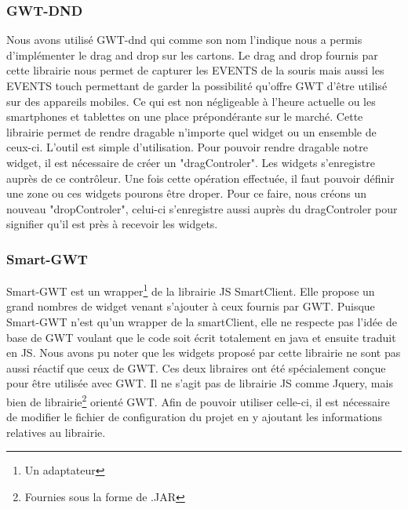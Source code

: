 \subsubsection{GWT-DND}
Nous avons utilisé GWT-dnd qui comme son nom l'indique nous a permis
d'implémenter le drag and drop sur les cartons. Le drag and drop fournis par
cette librairie nous permet de capturer les EVENTS de la souris mais aussi les EVENTS touch permettant de garder la possibilité qu'offre GWT d'être utilisé sur des appareils mobiles. Ce qui est non négligeable à l'heure actuelle ou les smartphones et tablettes on une place prépondérante sur le marché. Cette librairie permet de rendre dragable n'importe quel widget ou un ensemble de ceux-ci.
\newline
\indent
L'outil est simple d'utilisation. Pour pouvoir rendre dragable notre widget, il est nécessaire de créer un "dragControler". Les widgets s'enregistre auprès de ce contrôleur. Une fois cette opération effectuée, il faut pouvoir définir une zone ou ces widgets pourons être droper. Pour ce faire, nous créons un nouveau "dropControler", celui-ci s'enregistre aussi auprès du dragControler pour signifier qu'il est près à recevoir les widgets.

\subsubsection{Smart-GWT}
Smart-GWT est un wrapper\footnote{Un adaptateur} de la librairie JS SmartClient. Elle propose un grand nombres de widget venant s'ajouter à ceux fournis par GWT. Puisque Smart-GWT n'est qu'un wrapper de la smartClient, elle ne respecte pas l'idée de base de GWT voulant que le code soit écrit totalement en java et ensuite traduit en JS. Nous avons pu noter que les widgets proposé par cette librairie ne sont pas aussi réactif que ceux de GWT.
\newline
\indent
Ces deux libraires ont été spécialement conçue pour être utilisée avec GWT. Il ne s'agit pas de librairie JS comme Jquery, mais bien de librairie\footnote{Fournies sous la forme de .JAR} orienté GWT. Afin de pouvoir utiliser celle-ci, il est nécessaire de modifier le fichier de configuration du projet en y ajoutant les informations relatives au librairie.



